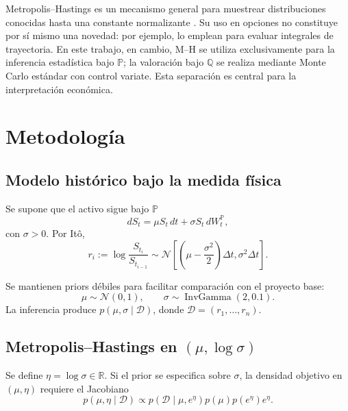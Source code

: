 \documentclass[12pt,letterpaper]{article}
\newcommand{\Pmeasure}{\mathbb{P}}
\newcommand{\Qmeasure}{\mathbb{Q}}
\begin{document}
Metropolis--Hastings es un mecanismo general para muestrear distribuciones conocidas hasta una constante normalizante \citep{metropolis1953,hastings1970}. Su uso en opciones no constituye por sí mismo una novedad: por ejemplo, \citet{capuozzo2021} lo emplean para evaluar integrales de trayectoria. En este trabajo, en cambio, M--H se utiliza exclusivamente para la inferencia estadística bajo $\Pmeasure$; la valoración bajo $\Qmeasure$ se realiza mediante Monte Carlo estándar con control variate. Esta separación es central para la interpretación económica.

\section{Metodología}

\subsection{Modelo histórico bajo la medida física}

Se supone que el activo sigue bajo $\Pmeasure$
\begin{equation}
 dS_t=\mu S_t\,dt+\sigma S_t\,dW_t^{\Pmeasure},
 \label{eq:p_gbm}
\end{equation}
con $\sigma>0$. Por It\^o,
\begin{equation}
 r_i:=\log\frac{S_{t_i}}{S_{t_{i-1}}}
 \sim
 \mathcal N\!\left[
 \left(\mu-\frac{\sigma^2}{2}\right)\Delta t,
 \sigma^2\Delta t
 \right].
 \label{eq:returns}
\end{equation}

Se mantienen priors débiles para facilitar comparación con el proyecto base:
\begin{equation}
 \mu\sim\mathcal N(0,1),
 \qquad
 \sigma\sim\operatorname{InvGamma}(2,0.1).
\end{equation}
La inferencia produce $p(\mu,\sigma\mid\mathcal D)$, donde $\mathcal D=(r_1,\ldots,r_n)$.

\subsection{Metropolis--Hastings en $(\mu,\log\sigma)$}

Se define $\eta=\log\sigma\in\mathbb R$. Si el prior se especifica sobre $\sigma$, la densidad objetivo en $(\mu,\eta)$ requiere el Jacobiano
\begin{equation}
 p(\mu,\eta\mid\mathcal D)
 \propto
 p(\mathcal D\mid\mu,e^{\eta})
 p(\mu)p(e^{\eta})e^{\eta}.
 \label{eq:jacobian}
\end{equation}
\end{document}
